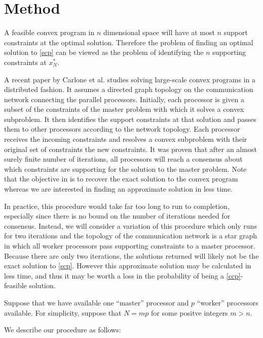 \documentclass[12pt]{article}
\begin{document}
\section*{Method}
A feasible convex program in $n$ dimensional space will have at most $n$ support constraints at the optimal solution.
Therefore the problem of finding an optimal solution to \ref{scp} can be viewed as the problem of identifying the $n$ supporting constraints at $x_N^*$.

A recent paper by Carlone et al. \cite{carlone2014} studies solving large-scale convex programs in a distributed fashion.
It assumes a directed graph topology on the communication network connecting the parallel processors.
Initially, each processor is given a subset of the constraints of the master problem with which it solves a convex subproblem.
It then identifies the support constraints at that solution and passes them to other processors according to the network topology.
Each processor receives the incoming constraints and resolves a convex subproblem with their original set of constraints the new constraints.
It was proven that after an almost surely finite number of iterations, all processors will reach a consensus about which constraints are supporting for the solution to the master problem.
Note that the objective in \cite{carlone2014} is to recover the exact solution to the convex program whereas we are interested in finding an approximate solution in less time.

In practice, this procedure would take far too long to run to completion, especially since there is no bound on the number of iterations needed for consensus.
Instead, we will consider a variation of this procedure which only runs for two iterations and the topology of the communication network is a star graph in which all worker processors pass supporting constraints to a master processor.
Because there are only two iterations, the solutions returned will likely not be the exact solution to \ref{scp}.
However this approximate solution may be calculated in less time, and thus it may be worth a loss in the probability of being a \ref{ccp}-feasible solution.

Suppose that we have available one ``master'' processor and $p$ ``worker'' processors available.
For simplicity, suppose that $N = mp$ for some positve integers $m > n$.

We describe our procedure as follows:
\end{document}
